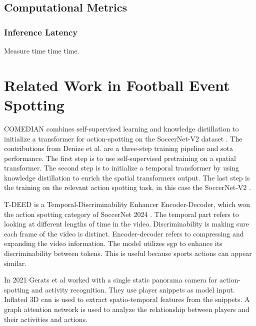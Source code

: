 \subsection{Computational Metrics} %
\subsubsection{Inference Latency} %
Measure time time time.


\section{Related Work in Football Event Spotting}
\label{sec:fw_work}

COMEDIAN \cite{denize_comedian_2024} combines self-supervised learning and knowledge distillation to initialize a transformer for action-spotting on the SoccerNet-V2 dataset \cite{deliege_soccernet-v2_dataset_2021}. The contributions from Denize et al. are a three-step training pipeline and \acrshort{sota} performance. The first step is to use self-supervised pretraining on a spatial transformer. The second step is to initialize a temporal transformer by using knowledge distillation to enrich the spatial transformers output. The last step is the training on the relevant action spotting task, in this case the SoccerNet-V2 \cite{deliege_soccernet-v2_dataset_2021}.

T-DEED \cite{xarles_t-deed_2024} is a Temporal-Discriminability Enhancer Encoder-Decoder, which won the action spotting category of SoccerNet 2024 \cite{cioppa_soccernet_2024}. The temporal part refers to looking at different lengths of time in the video. Discriminability is making sure each frame of the video is distinct. Encoder-decoder refers to compressing and expanding the video information. The model utilizes \acrfull{sgp} to enhance its discriminability between tokens. This is useful because sports actions can appear similar. 

In 2021 Gerats et al\cite{gerats_individual_same_task_2021} worked with a single static panorama camera for action-spotting and activity recognition. They use player snippets as model input. Inflated 3D \acrshort{cnn} is used to extract spatio-temporal features from the snippets. A graph attention network is used to analyze the relationship between players and their activities and actions. 




